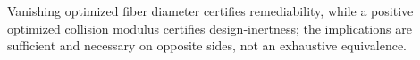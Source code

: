 Vanishing optimized fiber diameter certifies remediability, while a positive optimized collision modulus certifies design-inertness; the implications are sufficient and necessary on opposite sides, not an exhaustive equivalence.